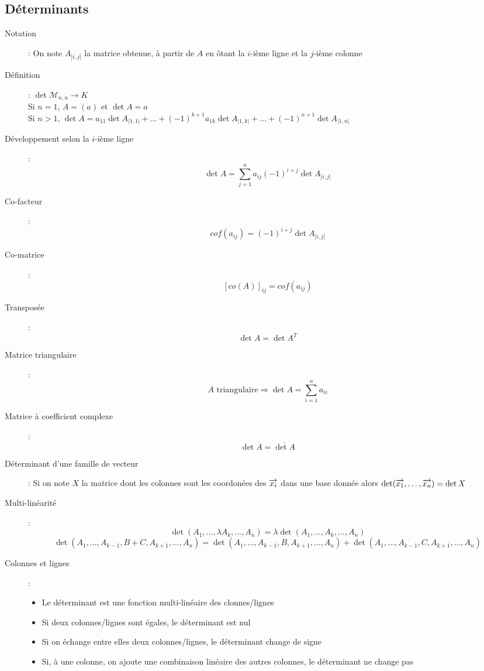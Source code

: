 \subsection{Déterminants}
\begin{description}
\item[Notation] : On note $A_{|i,j|}$ la matrice obtenue, à partir de $A$ en ôtant la $i$-ième ligne et la $j$-ième colonne
\item[Définition] : $\det \mathcal{M}_{n,n}\rightarrow K$\\
    Si $n=1$, $A=(a)$ et $\det A=a$\\
    Si $n > 1$, $\det A=a_{11}\det A_{|1,1|}+\dots + (-1)^{k+1}a_{1k}\det A_{|1,k|}+\dots +(-1)^{n+1}\det A_{|1,n|}$
\item[Développement selon la $i$-ième ligne] : 
    \[
        \det A = \sum_{j=1}^n a_{ij}(-1)^{i+j}\det A_{|i,j|}
    \]
\item[Co-facteur] : 
    \[
        cof(a_{ij})=(-1)^{i+j}\det A_{|i,j|}
    \]
\item[Co-matrice] :
    \[
        [co(A)]_{ij}=cof(a_{ij})
    \]
\item[Transposée] : 
    \[
        \det A = \det A^T
    \]
\item[Matrice triangulaire] : 
    \[
        A \textrm{ triangulaire} \Rightarrow \det A = \sum_{i=1}^n a_{ii}
    \]
\item[Matrice à coefficient complexe] : 
    \[
        \det \overline A=\overline{\det A}
    \]
\item[Déterminant d'une famille de vecteur] : Si on note $X$ la matrice dont les colonnes sont les coordonées des $\overrightarrow{x_i}$ dans une base donnée alors $\det(\overrightarrow{x_1}, \dots, \overrightarrow{x_n})=\det X$
\item[Multi-linéarité] : \[ \det(A_1,\dots,\lambda A_k, \dots, A_n)=\lambda\det(A_1,\dots,A_k,\dots,A_n) \]
    \[
        \det(A_1,\dots,A_{k-1},B+C,A_{k+1},\dots,A_n) =
        \det(A_1,\dots,A_{k-1},B,A_{k+1},\dots,A_n) +
        \det(A_1,\dots,A_{k-1},C,A_{k+1},\dots,A_n)
    \]
\item[Colonnes et lignes] : 
\begin{itemize}
    \item Le déterminant est une fonction multi-linéaire des clonnes/lignes
    \item Si deux colonnes/lignes sont égales, le déterminant est nul
    \item Si on échange entre elles deux colonnes/lignes, le déterminant change de signe
    \item Si, à une colonne, on ajoute une combinaison linéaire des autres colonnes, le déterminant ne change pas

\end{itemize}
\end{description}

